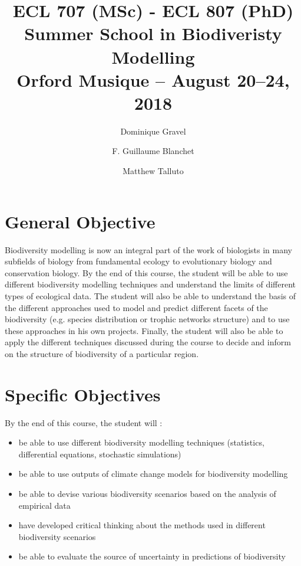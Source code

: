 \documentclass[12]{article}
\title{ECL 707 (MSc) - ECL 807 (PhD) \\ Summer School in Biodiveristy Modelling\\Orford Musique -- August 20--24, 2018}
\date {}
\author[1]{Dominique Gravel}
\author[1]{F. Guillaume Blanchet}
\author[2]{Matthew Talluto}
\affil[1]{Départment de biologie, Université de Sherbrooke}
\affil[2]{Leibniz-Institute of freshwater ecology and inland fisheries}
\begin{document}
	\maketitle

	\section*{General Objective}

  Biodiversity modelling is now an integral part of the work of biologists in
  many subfields of biology from fundamental ecology to evolutionary biology and
  conservation biology. By the end of this course, the student will be able to
  use different biodiversity modelling techniques and understand the limits of
  different types of ecological data. The student will also be able to
  understand the basis of the different approaches used to model and predict
  different facets of the biodiversity (e.g. species distribution or trophic
  networks structure) and to use these approaches in his own projects. Finally,
  the student will also be able to apply the different techniques discussed
  during the course to decide and inform on the structure of biodiversity of a
  particular region.

	\section*{Specific Objectives}

	By the end of this course, the student will :

	\begin{itemize}
	\renewcommand{\labelitemi}{$\bullet$}

  \item be able to use different biodiversity modelling techniques (statistics,
  differential equations, stochastic simulations)

  \item be able to use outputs of climate change models for biodiversity
  modelling

  \item be able to devise various biodiversity scenarios based on the analysis
  of empirical data

  \item have developed critical thinking about the methods used in different
  biodiversity scenarios

  \item be able to evaluate the source of uncertainty in predictions of
  biodiversity

	\end{itemize}
\end{document}
